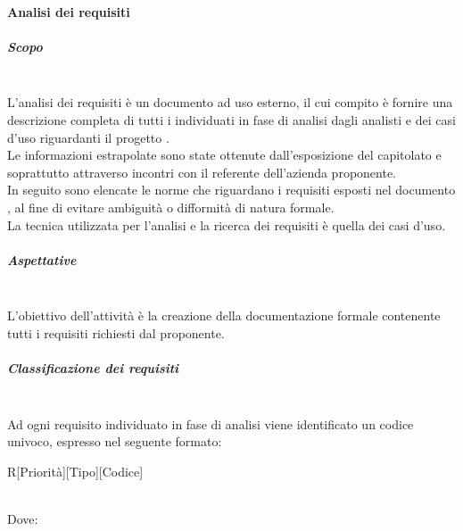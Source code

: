     \paragraph{Analisi dei requisiti}
        \subparagraph{Scopo}
         ~\\
         L'analisi dei requisiti è un documento ad uso esterno, il cui compito è fornire una descrizione completa di tutti i 
          individuati in fase di analisi dagli analisti e dei casi d'uso riguardanti il progetto . \\
         Le informazioni estrapolate sono state ottenute dall'esposizione del capitolato e soprattutto attraverso incontri con il referente dell'azienda proponente. \\
         In seguito sono elencate le norme che riguardano i requisiti esposti nel documento \AdR, al fine di evitare ambiguità o difformità di natura formale. \\
         La tecnica utilizzata per l’analisi e la ricerca dei requisiti è quella dei casi d’uso.
         \subparagraph{Aspettative}
         ~\\
         L'obiettivo dell'attività è la creazione della documentazione formale contenente tutti i requisiti richiesti dal proponente.
        \subparagraph{Classificazione dei requisiti}
        ~\\
        Ad ogni requisito individuato in fase di analisi viene identificato un codice univoco, espresso nel seguente formato:\\
        \begin{center}
        R[Priorità][Tipo][Codice]
        \end{center}
        \\
        Dove:
